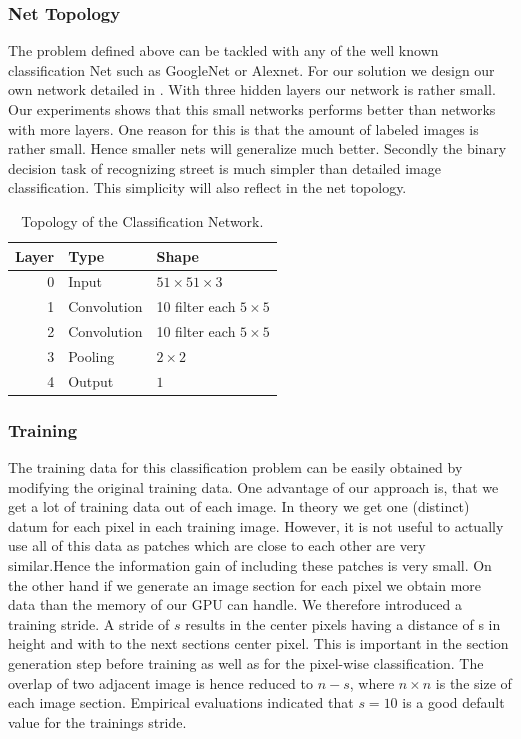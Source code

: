 \subsubsection{Net Topology}
The problem defined above can be tackled with any of the well known
classification Net such as GoogleNet or Alexnet. For our solution we design our
own network detailed in . With three hidden layers our network
is rather small. Our experiments shows that this small networks performs better
than networks with more layers. One reason for this is that the amount of
labeled images is rather small. Hence smaller nets will generalize much better.
Secondly the binary decision task of recognizing street is much simpler than
detailed image classification. This simplicity will also reflect in the net
topology.

\begin{table}[H]
	\normalsize
	\centering
\begin{tabular}{r  l l}
	\toprule
	\textbf{Layer} & \textbf{Type}  & \textbf{Shape}  \\
	\midrule
	0     & Input &  $51 \times 51 \times 3$ \\
	1     & Convolution & 10 filter  each $5 \times 5$ \\
	2     & Convolution & 10 filter  each $5 \times 5$  \\
	3     & Pooling     & $2 \times 2$ \\
	4     & Output     & $1$ \\
	\bottomrule
\end{tabular}
\caption{Topology of the Classification Network.}
\label{tab:topo}
\end{table}

\subsubsection{Training}

The training data for this classification problem can be easily obtained by modifying the original training data. One advantage of our approach is, that we get a lot of training data out of each image. In theory we get one (distinct) datum for each pixel in each training image. However, it is not useful to actually use all of this data as patches which are close to each other are very similar.Hence the information gain of including these patches is very small. On the other hand if we generate an image section for each pixel we obtain more data than the memory of our GPU can handle. We therefore introduced a training stride. A stride of $s$ results in the center pixels having a distance of s in height and with to the next sections center pixel. This is important in the section generation step before training as well as for the pixel-wise classification. The overlap of two adjacent image is hence reduced to $n-s$, where $n \times n$ is the size of each image section. Empirical evaluations indicated that $s=10$ is a good default value for the trainings stride.



